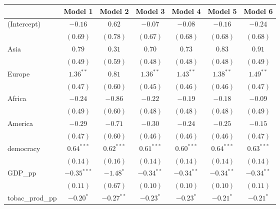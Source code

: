 
\begin{table}[!h]
\begin{center}
\begin{tabular}{l c c c c c c }
\toprule
 & Model 1 & Model 2 & Model 3 & Model 4 & Model 5 & Model 6 \\
\midrule
(Intercept)             & $-0.16$       & $0.62$       & $-0.07$      & $-0.08$      & $-0.16$      & $-0.24$      \\
                        & $(0.69)$      & $(0.78)$     & $(0.67)$     & $(0.68)$     & $(0.68)$     & $(0.68)$     \\
Asia                    & $0.79$        & $0.31$       & $0.70$       & $0.73$       & $0.83$       & $0.91$       \\
                        & $(0.49)$      & $(0.59)$     & $(0.48)$     & $(0.48)$     & $(0.48)$     & $(0.49)$     \\
Europe                  & $1.36^{**}$   & $0.81$       & $1.36^{**}$  & $1.43^{**}$  & $1.38^{**}$  & $1.49^{**}$  \\
                        & $(0.47)$      & $(0.60)$     & $(0.45)$     & $(0.46)$     & $(0.46)$     & $(0.47)$     \\
Africa                  & $-0.24$       & $-0.86$      & $-0.22$      & $-0.19$      & $-0.18$      & $-0.09$      \\
                        & $(0.49)$      & $(0.60)$     & $(0.48)$     & $(0.48)$     & $(0.48)$     & $(0.49)$     \\
America                 & $-0.29$       & $-0.71$      & $-0.30$      & $-0.24$      & $-0.25$      & $-0.15$      \\
                        & $(0.47)$      & $(0.60)$     & $(0.46)$     & $(0.46)$     & $(0.46)$     & $(0.47)$     \\
democracy               & $0.64^{***}$  & $0.62^{***}$ & $0.61^{***}$ & $0.60^{***}$ & $0.64^{***}$ & $0.63^{***}$ \\
                        & $(0.14)$      & $(0.16)$     & $(0.14)$     & $(0.14)$     & $(0.14)$     & $(0.14)$     \\
GDP\_pp                 & $-0.35^{***}$ & $-1.48^{*}$  & $-0.34^{**}$ & $-0.34^{**}$ & $-0.34^{**}$ & $-0.34^{**}$ \\
                        & $(0.11)$      & $(0.67)$     & $(0.10)$     & $(0.10)$     & $(0.10)$     & $(0.11)$     \\
tobac\_prod\_pp         & $-0.20^{*}$   & $-0.27^{**}$ & $-0.23^{*}$  & $-0.23^{*}$  & $-0.21^{*}$  & $-0.21^{*}$  \\

\end{tabular}
\end{center}
\end{table}
